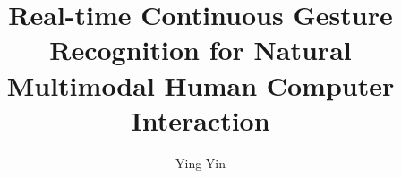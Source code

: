 % 
% 
%
%
%
%
%
%
%
% 
% 

\title{Real-time Continuous Gesture Recognition for Natural Multimodal Human
Computer Interaction}

\author{Ying Yin}



